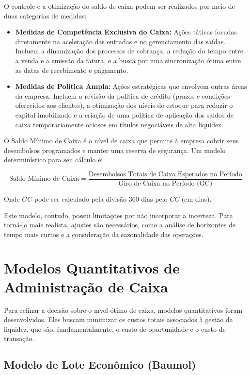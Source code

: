 \documentclass[
  a4paper,
]{book}
\begin{document}
O controle e a otimização do saldo de caixa podem ser realizados por
meio de duas categorias de medidas:

\begin{itemize}
\item
  \textbf{Medidas de Competência Exclusiva do Caixa:} Ações táticas
  focadas diretamente na aceleração das entradas e no gerenciamento das
  saídas. Incluem a dinamização dos processos de cobrança, a redução do
  tempo entre a venda e a emissão da fatura, e a busca por uma
  sincronização ótima entre as datas de recebimento e pagamento.
\item
  \textbf{Medidas de Política Ampla:} Ações estratégicas que envolvem
  outras áreas da empresa. Incluem a revisão da política de crédito
  (prazos e condições oferecidos aos clientes), a otimização dos níveis
  de estoque para reduzir o capital imobilizado e a criação de uma
  política de aplicação dos saldos de caixa temporariamente ociosos em
  títulos negociáveis de alta liquidez.
\end{itemize}

O Saldo Mínimo de Caixa é o nível de caixa que permite à empresa cobrir
seus desembolsos programados e manter uma reserva de segurança. Um
modelo determinístico para seu cálculo é:

\[\text{Saldo Mínimo de Caixa} = \frac{\text{Desembolsos Totais de Caixa Esperados no Período}}{\text{Giro de Caixa no Período (GC)}}\]

Onde \(GC\) pode ser calculado pela divisão 360 dias pelo \(CC\) (em
dias).

Este modelo, contudo, possui limitações por não incorporar a incerteza.
Para torná-lo mais realista, ajustes são necessários, como a análise de
horizontes de tempo mais curtos e a consideração da sazonalidade das
operações.

\section{Modelos Quantitativos de Administração de
Caixa}\label{modelos-quantitativos-de-administrauxe7uxe3o-de-caixa}

Para refinar a decisão sobre o nível ótimo de caixa, modelos
quantitativos foram desenvolvidos. Eles buscam minimizar os custos
totais associados à gestão da liquidez, que são, fundamentalmente, o
custo de oportunidade e o custo de transação.

\subsection{Modelo de Lote Econômico
(Baumol)}\label{modelo-de-lote-econuxf4mico-baumol}
\end{document}
